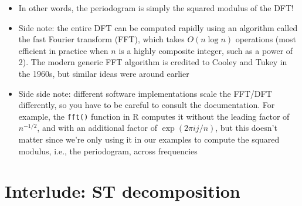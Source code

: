 \documentclass{article}
\begin{document}
\begin{itemize}
\item In other words, the periodogram is simply the squared modulus of the DFT! 

\item Side note: the entire DFT can be computed rapidly using an algorithm
  called the fast Fourier transform (FFT), which takes $O(n\log{n})$ operations 
  (most efficient in practice when $n$ is a highly composite integer, such as a
  power of 2). The modern generic FFT algorithm is credited to Cooley and Tukey
  in the 1960s, but similar ideas were around earlier   

\item Side side note: different software implementations scale the FFT/DFT 
  differently, so you have to be careful to consult the documentation. For
  example, the \verb|fft()| function in R computes it without the leading factor
  of $n^{-1/2}$, and with an additional factor of $\exp(2\pi i j/n)$, but this
  doesn't matter since we're only using it in our examples to compute the
  squared modulus, i.e., the periodogram, across frequencies
\end{itemize}

\section{Interlude: ST decomposition}
\end{document}
